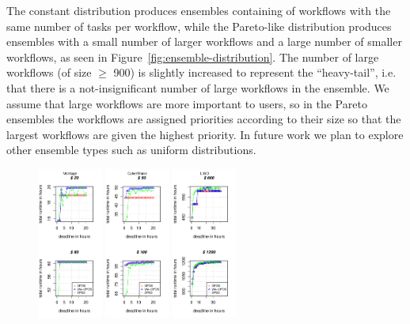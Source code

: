 \documentclass{sig-alternate}
\begin{document}
The constant distribution produces ensembles containing of workflows with the same number of tasks per workflow, 
while the Pareto-like distribution produces ensembles with a small number of larger 
workflows and a large number of smaller workflows, as seen in 
Figure~\ref{fig:ensemble-distribution}. The number of large workflows (of size $\geq$ 900) 
is slightly increased to represent the ``heavy-tail'', i.e. that there is a 
not-insignificant number of large workflows in the ensemble. We assume that large
workflows are more important to users, so in the Pareto ensembles the workflows are 
assigned priorities according to their size so that the largest workflows are given 
the highest priority. In
future work we plan to explore other ensemble types such as uniform distributions.

\begin{figure}[t]  
\centering
\includegraphics[width=0.19\textwidth]{figures/pareto-size-MONTAGE-n-1000-8-dagh1-20m0.pdf}
\includegraphics[width=0.19\textwidth]{figures/pareto-size-CYBERSHAKE-n-1000-8-dagh1-20m0.pdf}
\includegraphics[width=0.19\textwidth]{figures/pareto-size-LIGO-n-1000-8-dagh1-40m0.pdf}

\end{figure}
\end{document}
